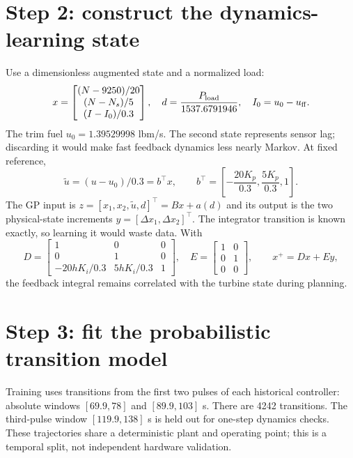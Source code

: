 \section{Step 2: construct the dynamics-learning state}
Use a dimensionless augmented state and a normalized load:
\begin{equation}
 x=\begin{bmatrix}(N-9250)/20\\(N-N_s)/5\\(I-I_0)/0.3\end{bmatrix},\quad
 d=\frac{P_{\rm load}}{1537.6791946},\quad I_0=u_0-u_{\rm ff}.
\end{equation}
The trim fuel $u_0=1.39529998$ lbm/s. The second state represents sensor lag; discarding it would make fast feedback dynamics less nearly Markov. At fixed reference,
\begin{equation}
 \tilde u=(u-u_0)/0.3=b^\top x,\qquad
 b^\top=\left[-\frac{20K_p}{0.3},\frac{5K_p}{0.3},1\right].
\end{equation}
The GP input is $z=[x_1,x_2,\tilde u,d]^\top=B x+a(d)$ and its output is the two physical-state increments $y=[\Delta x_1,\Delta x_2]^\top$. The integrator transition is known exactly, so learning it would waste data. With
\begin{equation}
 D=\begin{bmatrix}1&0&0\\0&1&0\\-20hK_i/0.3&5hK_i/0.3&1\end{bmatrix},\quad
 E=\begin{bmatrix}1&0\\0&1\\0&0\end{bmatrix},\qquad x^+=Dx+Ey,
\end{equation}
the feedback integral remains correlated with the turbine state during planning.

\section{Step 3: fit the probabilistic transition model}
Training uses transitions from the first two pulses of each historical controller: absolute windows $[69.9,78]$ and $[89.9,103]$ s. There are 4242 transitions. The third-pulse window $[119.9,138]$ s is held out for one-step dynamics checks. These trajectories share a deterministic plant and operating point; this is a temporal split, not independent hardware validation.

